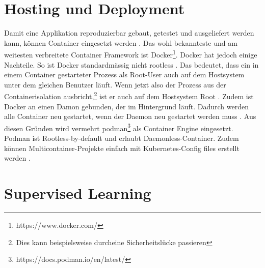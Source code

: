 %

\section{Hosting und Deployment}
\label{state:deployment}


Damit eine Applikation reproduzierbar
gebaut, getestet und ausgeliefert werden kann, können Container eingesetzt werden \parencite{what-is-a-container}.
Das wohl bekannteste und am weitesten verbreitete Container Framework
ist Docker\footnote{https://www.docker.com/}. Docker hat jedoch einige Nachteile.
So ist Docker standardmässig nicht rootless \parencite{docker:rootless}.
Das bedeutet, dass ein in einem Container gestarteter Prozess als Root-User
auch auf dem Hostsystem unter dem gleichen Benutzer läuft.
Wenn jetzt also
der Prozess aus der Containerisolation ausbricht,\footnote{Dies kann beispielsweise durcheine Sicherheitslücke passieren}
ist er auch auf dem Hostsystem Root \parencite{so_2020}.
Zudem ist Docker an einen Damon gebunden, der im Hintergrund läuft.
Dadurch werden alle Container neu gestartet, wenn der Daemon neu gestartet werden muss \parencite{docker:daemon}.
Aus diesen Gründen wird vermehrt podman\footnote{https://docs.podman.io/en/latest/}
als Container Engine eingesetzt.
Podman ist Rootless-by-default und erlaubt Daemonless-Container.
Zudem können Multicontainer-Projekte einfach mit Kubernetes-Config files
erstellt werden \parencite{redhat:podman-pods}.

\section{Supervised Learning}
\label{state:supervised-learning}

